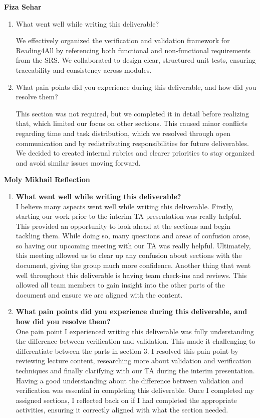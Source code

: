 \documentclass[12pt, titlepage]{article}
\begin{document}
\textbf{Fiza Sehar}
\begin{enumerate}
\item What went well while writing this deliverable?

We effectively organized the verification and validation framework for Reading4All by referencing both functional and non-functional requirements from the SRS. We collaborated to design clear, structured unit tests, ensuring traceability and consistency across modules.

\item What pain points did you experience during this deliverable, and how did you resolve them?

This section was not required, but we completed it in detail before realizing that, which limited our focus on other sections. This caused minor conflicts regarding time and task distribution, which we resolved through open communication and by redistributing responsibilities for future deliverables. We decided to created internal rubrics and clearer priorities to stay organized and avoid similar issues moving forward.

\end{enumerate}


\textbf{Moly Mikhail Reflection}
\begin{enumerate}
  \item \textbf{What went well while writing this deliverable?}\\
  I believe many aspects went well while writing this deliverable. Firstly, starting our work prior to the interim TA presentation was really helpful. 
  This provided an opportunity to look ahead at the sections and begin tackling them. While doing so, many questions and areas of confusion arose, so having our upcoming meeting with our TA was really helpful. 
  Ultimately, this meeting allowed us to clear up any confusion about sections with the document, giving the group much more confidence. Another thing that went well throughout this deliverable is having team check-ins and reviews. 
  This allowed all team members to gain insight into the other parts of the document and ensure we are aligned with the content.
  \item \textbf{What pain points did you experience during this deliverable, and how
    did you resolve them?}\\
  One pain point I experienced writing this deliverable was fully understanding the difference between verification and validation. This made it challenging to differentiate between the parts in section 3.
  I resolved this pain point by reviewing lecture content, researching more about validation and verification techniques and finally clarifying with our TA during the interim presentation. 
  Having a good understanding about the difference between validation and verification was essential in completing this deliverable. Once I completed 
  my assigned sections, I reflected back on if I had completed the appropriate activities, ensuring it correctly aligned with what the section needed. 
\end{enumerate}
\end{document}
